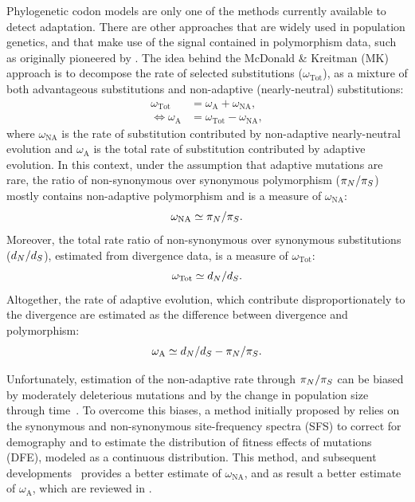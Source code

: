 Phylogenetic codon models are only one of the methods currently available to detect adaptation.
There are other approaches that are widely used in population genetics, and that make use of the signal contained in polymorphism data, such as originally pioneered by \citet{McDonald1991}.
The idea behind the McDonald \& Kreitman (MK) approach is to decompose the rate of selected substitutions ($\omega_{\text{Tot}}$), as a mixture of both advantageous substitutions and non-adaptive (nearly-neutral) substitutions:
\begin{align}
    \omega_{\text{Tot}} & = \omega_{\text{A}} + \omega_{\text{NA}}, \\
    \iff \omega_{\text{A}} & = \omega_{\text{Tot}} - \omega_{\text{NA}},
\end{align}
where $\omega_{\text{NA}}$ is the rate of substitution contributed by non-adaptive nearly-neutral evolution and $\omega_{\text{A}}$ is the total rate of substitution contributed by adaptive evolution.
In this context, under the assumption that adaptive mutations are rare, the ratio of non-synonymous over synonymous polymorphism ($\pi_N / \pi_S$) mostly contains non-adaptive polymorphism and is a measure of $\omega_{\text{NA}}$:
\begin{equation}
    \omega_{\text{NA}} \simeq \pi_N / \pi_S.
\end{equation}
Moreover, the total rate ratio of non-synonymous over synonymous substitutions ($d_N / d_S$), estimated from divergence data, is a measure of $\omega_{\text{Tot}}$:
\begin{equation}
    \omega_{\text{Tot}} \simeq d_N / d_S.
\end{equation}
Altogether, the rate of adaptive evolution, which contribute disproportionately to the divergence are estimated as the difference between divergence and polymorphism:
\begin{equation}
    \omega_{\text{A}} \simeq d_N / d_S - \pi_N / \pi_S.
\end{equation}

Unfortunately, estimation of the non-adaptive rate through $\pi_N / \pi_S$ can be biased by moderately deleterious mutations and by the change in population size through time~\citep{eyre-walker_changing_2002}.
To overcome this biases, a method initially proposed by \citet{eyre-walker_estimating_2009, Galtier2016} relies on the synonymous and non-synonymous site-frequency spectra (\acrshort{SFS}) to correct for demography and to estimate the distribution of fitness effects of mutations (\acrshort{DFE}), modeled as a continuous distribution.
This method, and subsequent developments~\citep{Galtier2016} provides a better estimate of $\omega_{\text{NA}}$, and as result a better estimate of $\omega_{\text{A}}$, which are reviewed in \citet{Moutinho2019a}.

